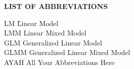 {}

\begin{center}
{\Large \textbf{LIST OF ABBREVIATIONS}}
\end{center}

\newcommand{\Ab}[2]{\noindent  #1 \> #2 \\}
\newcommand{\Abi}[2]{\noindent #1 \hspace{1.5cm} \= #2 \\}

\begin{tabbing}
\Abi{LM}{Linear Model}
\Ab{LMM}{Linear Mixed Model}
\Ab{GLM}{Generalized Linear Model}
\Ab{GLMM}{Generalized Linear Mixed Model}
\Ab{AYAH}{All Your Abbreviations Here}
\end{tabbing}

\clearpage
